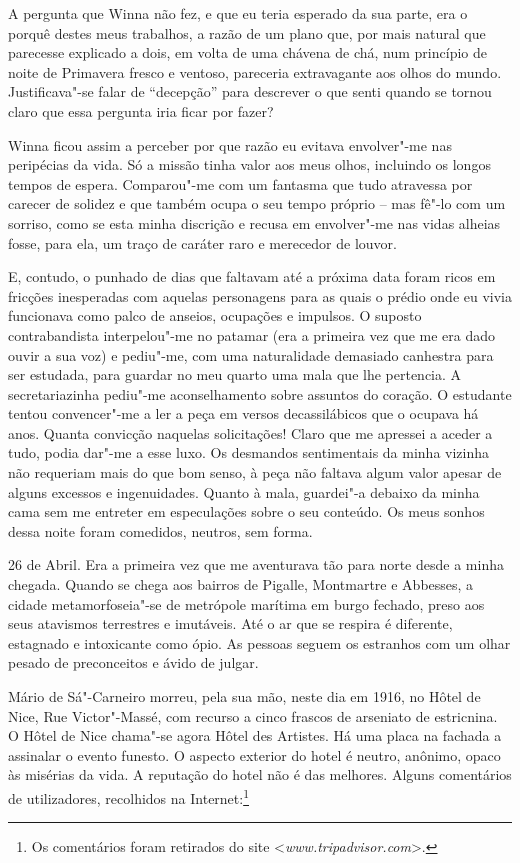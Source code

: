 A pergunta que Winna não fez, e que eu teria esperado da sua parte, era
o porquê destes meus trabalhos, a razão de um plano que, por mais
natural que parecesse explicado a dois, em volta de uma chávena de chá,
num princípio de noite de Primavera fresco e ventoso, pareceria
extravagante aos olhos do mundo. Justificava"-se falar de ``decepção''
para descrever o que senti quando se tornou claro que essa pergunta iria
ficar por fazer?

Winna ficou assim a perceber por que razão eu evitava envolver"-me nas
peripécias da vida. Só a missão tinha valor aos meus olhos, incluindo os
longos tempos de espera. Comparou"-me com um fantasma que tudo
atravessa por carecer de solidez e que também ocupa o seu tempo próprio
-- mas fê"-lo com um sorriso, como se esta minha discrição e recusa em
envolver"-me nas vidas alheias fosse, para ela, um traço de caráter raro
e merecedor de louvor.

E, contudo, o punhado de dias que faltavam até a próxima data foram
ricos em fricções inesperadas com aquelas personagens para as quais o
prédio onde eu vivia funcionava como
palco de anseios, ocupações e impulsos. O suposto contrabandista
interpelou"-me no patamar (era a primeira vez que me era dado ouvir a sua
voz) e pediu"-me, com uma naturalidade demasiado canhestra para ser
estudada, para guardar no meu quarto uma mala que lhe pertencia. A
secretariazinha pediu"-me aconselhamento sobre assuntos do coração. O estudante tentou
convencer"-me a ler a peça em versos decassilábicos que o ocupava há
anos. Quanta convicção naquelas solicitações! Claro que me apressei a
aceder a tudo, podia dar"-me a esse luxo. Os desmandos sentimentais da
minha vizinha não requeriam mais do que bom senso, à peça não faltava
algum valor apesar de alguns excessos e ingenuidades. Quanto à mala,
guardei"-a debaixo da minha cama sem me entreter em especulações sobre o
seu conteúdo. Os meus sonhos dessa noite foram comedidos, neutros, sem
forma.

26 de Abril. Era a primeira vez que me aventurava tão para norte desde a
minha chegada. Quando se chega aos bairros de Pigalle, Montmartre e
Abbesses, a cidade metamorfoseia"-se de metrópole marítima em burgo
fechado, preso aos seus atavismos terrestres e imutáveis. Até o ar que
se respira é diferente, estagnado e intoxicante como ópio. As pessoas
seguem os estranhos com um olhar pesado de preconceitos e ávido de
julgar.

Mário de Sá"-Carneiro morreu, pela sua mão, neste dia em 1916, no Hôtel
de Nice, Rue Victor"-Massé, com recurso a cinco frascos de arseniato de
estricnina. O Hôtel de Nice chama"-se agora Hôtel des Artistes. Há uma
placa na fachada a assinalar o evento funesto. O aspecto exterior do
hotel é neutro, anônimo, opaco às misérias da vida. A reputação do hotel
não é das melhores. Alguns comentários de utilizadores, recolhidos na
Internet:\footnote{Os comentários foram retirados do site
\textless{}\emph{www.tripadvisor.com}\textgreater{}.}


